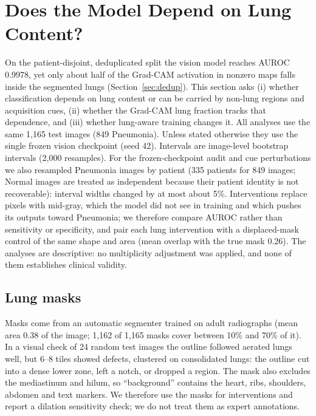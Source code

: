 \section{Does the Model Depend on Lung Content?}
\label{sec:lung-dependence}

On the patient-disjoint, deduplicated split the vision model reaches AUROC 0.9978, yet only about half of the
Grad-CAM activation in nonzero maps falls inside the segmented lungs (Section~\ref{sec:dedup}). This section
asks (i) whether classification depends on lung content or can be carried by non-lung regions and acquisition
cues, (ii) whether the Grad-CAM lung fraction tracks that dependence, and (iii) whether lung-aware training
changes it. All analyses use the same 1,165 test images (849 Pneumonia). Unless stated otherwise they use the
single frozen vision checkpoint (seed 42). Intervals are image-level bootstrap intervals (2,000 resamples).
For the frozen-checkpoint audit and cue perturbations we also resampled Pneumonia images by patient
(335 patients for 849 images; Normal images are treated as independent because their patient identity is
not recoverable): interval widths changed by at most about 5\%. Interventions replace pixels with mid-gray, which the
model did not see in training and which pushes its outputs toward Pneumonia; we therefore compare AUROC
rather than sensitivity or specificity, and pair each lung intervention with a displaced-mask control of the
same shape and area (mean overlap with the true mask 0.26). The analyses are descriptive: no multiplicity
adjustment was applied, and none of them establishes clinical validity.

\subsection{Lung masks}
Masks come from an automatic segmenter trained on adult radiographs (mean area 0.38 of the image; 1,162 of 1,165
masks cover between 10\% and 70\% of it). In a visual check of 24 random test images the outline followed
aerated lungs well, but 6--8 tiles showed defects, clustered on consolidated lungs: the outline cut into a
dense lower zone, left a notch, or dropped a region. The mask also excludes the mediastinum and hilum, so
``background'' contains the heart, ribs, shoulders, abdomen and text markers. We therefore use the masks for
interventions and report a dilation sensitivity check; we do not treat them as expert annotations.

